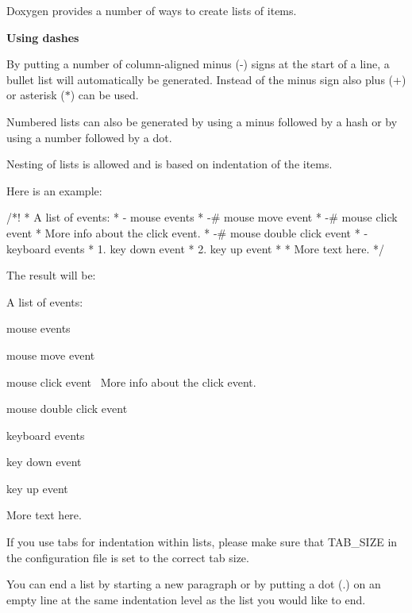 Doxygen provides a number of ways to create lists of items.

{\bfseries{Using dashes}}

By putting a number of column-\/aligned minus (-\/) signs at the start of a line, a bullet list will automatically be generated. Instead of the minus sign also plus (+) or asterisk ($\ast$) can be used.

Numbered lists can also be generated by using a minus followed by a hash or by using a number followed by a dot.

Nesting of lists is allowed and is based on indentation of the items.

Here is an example\+:

\begin{DoxyVerb}  /*! 
   *  A list of events:
   *    - mouse events
   *         -# mouse move event
   *         -# mouse click event\n
   *            More info about the click event.
   *         -# mouse double click event
   *    - keyboard events
   *         1. key down event
   *         2. key up event
   *
   *  More text here.
   */
\end{DoxyVerb}
 The result will be\+:

A list of events\+:
\begin{DoxyItemize}
\item mouse events
\begin{DoxyEnumerate}
\item mouse move event
\item mouse click event~\newline
 More info about the click event.
\item mouse double click event
\end{DoxyEnumerate}
\item keyboard events
\begin{DoxyEnumerate}
\item key down event
\item key up event
\end{DoxyEnumerate}
\end{DoxyItemize}

More text here.

If you use tabs for indentation within lists, please make sure that T\+A\+B\+\_\+\+S\+I\+ZE in the configuration file is set to the correct tab size.

You can end a list by starting a new paragraph or by putting a dot (.) on an empty line at the same indentation level as the list you would like to end.

